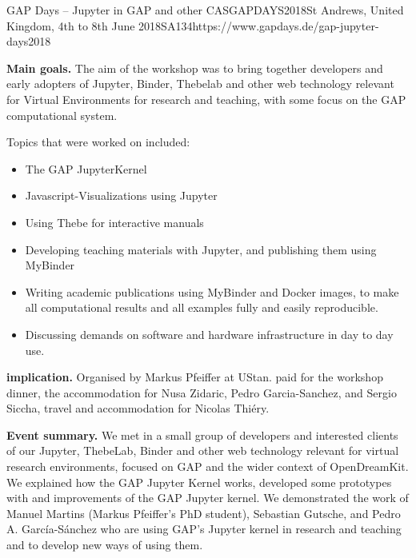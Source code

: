 \begin{event}{GAP Days -- Jupyter in GAP and other CAS}{GAPDAYS2018}{St Andrews, United Kingdom, 4th to 8th June 2018}{SA}{13}{4}{https://www.gapdays.de/gap-jupyter-days2018}

  \textbf{Main goals.} The aim of the workshop was to bring together
  developers and early adopters of Jupyter, Binder, Thebelab and other
  web technology relevant for Virtual Environments for research and
  teaching, with some focus on the GAP computational system.

Topics that were worked on included:

\begin{itemize}
\item The GAP JupyterKernel
\item Javascript-Visualizations using Jupyter
\item Using Thebe for interactive manuals
\item Developing teaching materials with Jupyter, and publishing them using MyBinder
\item Writing academic publications using MyBinder and Docker images, to make
  all computational results and all examples fully and easily reproducible.
\item Discussing demands on software and hardware infrastructure in day to day
  use.
\end{itemize}


\textbf{\ODK implication.} Organised by Markus Pfeiffer at UStan. \ODK paid for
the workshop dinner, the accommodation for Nusa Zidaric, Pedro
Garcia-Sanchez, and Sergio Siccha, travel and accommodation for Nicolas Thiéry.


\textbf{Event summary.} We met in a small group of developers and interested
clients of our Jupyter, ThebeLab, Binder and other web technology relevant for
virtual research environments, focused on GAP and the wider context of
OpenDreamKit. We explained how the GAP Jupyter Kernel works, developed some
prototypes with and improvements of the GAP Jupyter kernel.
%
We demonstrated the work of Manuel Martins (Markus Pfeiffer's PhD student),
Sebastian Gutsche, and Pedro A. García-Sánchez who are using GAP's Jupyter
kernel in research and teaching and to develop new ways of using them.



\end{event}
